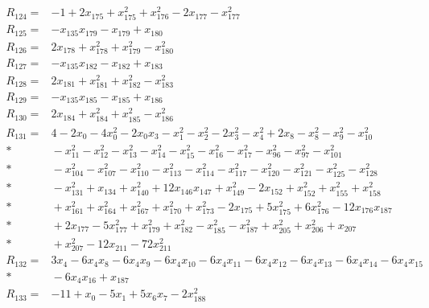 \documentclass[11pt]{article}
\theoremstyle{remark}\newtheorem{remark}[theorem]{Remark}
\begin{document}
\begin{align*}
R_{124} ={}& -1 + 2x_{175} + x_{175}^{2} + x_{176}^{2} - 2x_{177} - x_{177}^{2} \\[4pt]
R_{125} ={}& -x_{135}x_{179} - x_{179} + x_{180} \\[4pt]
R_{126} ={}& 2x_{178} + x_{178}^{2} + x_{179}^{2} - x_{180}^{2} \\[4pt]
R_{127} ={}& -x_{135}x_{182} - x_{182} + x_{183} \\[4pt]
R_{128} ={}& 2x_{181} + x_{181}^{2} + x_{182}^{2} - x_{183}^{2} \\[4pt]
R_{129} ={}& -x_{135}x_{185} - x_{185} + x_{186} \\[4pt]
R_{130} ={}& 2x_{184} + x_{184}^{2} + x_{185}^{2} - x_{186}^{2} \\[4pt]
R_{131} ={}& 4 - 2x_{0} - 4x_{0}^{2} - 2x_{0}x_{3} - x_{1}^{2} - x_{2}^{2} - 2x_{3}^{2} - x_{4}^{2} + 2x_{8} - x_{8}^{2} - x_{9}^{2} - x_{10}^{2} \\*
&{} - x_{11}^{2} - x_{12}^{2} - x_{13}^{2} - x_{14}^{2} - x_{15}^{2} - x_{16}^{2} - x_{17}^{2} - x_{96}^{2} - x_{97}^{2} - x_{101}^{2} \\*
&{} - x_{104}^{2} - x_{107}^{2} - x_{110}^{2} - x_{113}^{2} - x_{114}^{2} - x_{117}^{2} - x_{120}^{2} - x_{121}^{2} - x_{125}^{2} - x_{128}^{2} \\*
&{} - x_{131}^{2} + x_{134} + x_{140}^{2} + 12x_{146}x_{147} + x_{149}^{2} - 2x_{152} + x_{152}^{2} + x_{155}^{2} + x_{158}^{2} \\*
&{} + x_{161}^{2} + x_{164}^{2} + x_{167}^{2} + x_{170}^{2} + x_{173}^{2} - 2x_{175} + 5x_{175}^{2} + 6x_{176}^{2} - 12x_{176}x_{187} \\*
&{} + 2x_{177} - 5x_{177}^{2} + x_{179}^{2} + x_{182}^{2} - x_{185}^{2} - x_{187}^{2} + x_{205}^{2} + x_{206}^{2} + x_{207} \\*
&{} + x_{207}^{2} - 12x_{211} - 72x_{211}^{2} \\[4pt]
R_{132} ={}& 3x_{4} - 6x_{4}x_{8} - 6x_{4}x_{9} - 6x_{4}x_{10} - 6x_{4}x_{11} - 6x_{4}x_{12} - 6x_{4}x_{13} - 6x_{4}x_{14} - 6x_{4}x_{15} \\*
&{} - 6x_{4}x_{16} + x_{187} \\[4pt]
R_{133} ={}& -11 + x_{0} - 5x_{1} + 5x_{6}x_{7} - 2x_{188}^{2} \\[4pt]

\end{align*}
\end{document}
